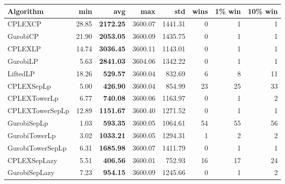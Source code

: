\begin{tabular}{lrrrrrrr}
Algorithm & min & avg & max & std
& wins & 1\% win & 10\% win 
\\
\hline
CPLEXCP&28.85& \bf2172.25& 3600.07& 1441.31&0&1&1\\
GurobiCP&21.90& \bf2053.05& 3600.09& 1435.75&0&1&1\\
CPLEXLP&14.74& \bf3036.45& 3600.11& 1143.01&0&1&1\\
GurobiLP&5.63& \bf2841.03& 3604.06& 1342.22&0&1&1\\
LiftedLP&18.26& \bf529.57& 3600.04& 832.69&6&8&11\\
CPLEXSepLp&5.00& \bf426.90& 3600.04& 854.99&23&25&33\\
CPLEXTowerLp&6.77& \bf740.08& 3600.06& 1163.97&0&1&2\\
CPLEXTowerSepLp&12.89& \bf1151.67& 3600.40& 1271.52&0&1&1\\
GurobiSepLp&1.03& \bf593.35& 3600.05& 1064.61&54&55&56\\
GurobiTowerLp&3.02& \bf1033.21& 3600.05& 1294.31&1&2&2\\
GurobiTowerSepLp&6.31& \bf1685.98& 3600.07& 1411.79&0&1&1\\
CPLEXSepLazy&5.51& \bf406.56& 3600.01& 752.93&16&17&24\\
GurobiSepLazy&7.23& \bf954.15& 3600.09& 1245.66&0&1&2
\end{tabular}
